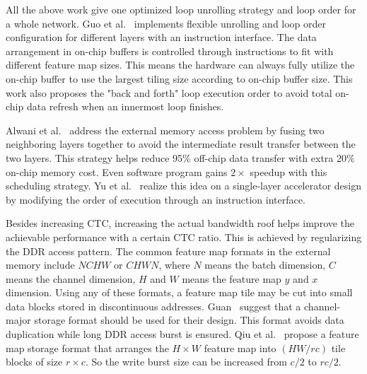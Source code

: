 All the above work give one optimized loop unrolling strategy and loop order for a whole network. Guo et al.~\cite{guo2017angel} implements flexible unrolling and loop order configuration for different layers with an instruction interface. The data arrangement in on-chip buffers is controlled through instructions to fit with different feature map sizes. This means the hardware can always fully utilize the on-chip buffer to use the largest tiling size according to on-chip buffer size. This work also proposes the "back and forth" loop execution order to avoid total on-chip data refresh when an innermost loop finishes.

Alwani et al.~\cite{alwani2016fused} address the external memory access problem by fusing two neighboring layers together to avoid the intermediate result transfer between the two layers. This strategy helps reduce 95\% off-chip data transfer with extra 20\% on-chip memory cost. Even software program gains $2\times$ speedup with this scheduling strategy. Yu et al.~\cite{Yu2017Instruction} realize this idea on a single-layer accelerator design by modifying the order of execution through an instruction interface.

Besides increasing CTC, increasing the actual bandwidth roof helps improve the achievable performance with a certain CTC ratio. This is achieved by regularizing the DDR access pattern. The common feature map formats in the external memory include $NCHW$ or $CHWN$, where $N$ means the batch dimension, $C$ means the channel dimension, $H$ and $W$ means the feature map $y$ and $x$ dimension. Using any of these formats, a feature map tile may be cut into small data blocks stored in discontinuous addresses. Guan~\cite{guan2017fp} suggest that a channel-major storage format should be used for their design. This format avoids data duplication while long DDR access burst is ensured. Qiu et al.~\cite{qiu2016going} propose a feature map storage format that arranges the $H\times W$ feature map into $(HW/rc)$ tile blocks of size $r\times c$. So the write burst size can be increased from $c/2$ to $rc/2$.
